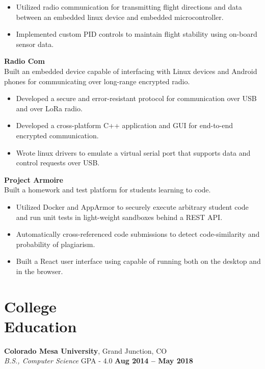 \documentclass[margin,line]{resume}
\begin{document}
\begin{resume}
	\begin{itemize}
	\item Utilized radio communication for transmitting
	      flight directions and data between an embedded linux
	      device and embedded microcontroller.
	\item Implemented custom PID controls to maintain flight stability
	      using on-board sensor data.
	\end{itemize}

    \textbf{Radio Com}\\
    Built an embedded device capable of interfacing with Linux devices and
    Android phones for communicating over long-range encrypted radio.

        \begin{itemize}
        \item Developed a secure and error-resistant protocol for communication
              over USB and over LoRa radio.
        \item Developed a cross-platform C++ application and GUI for end-to-end
              encrypted communication.
        \item Wrote linux drivers to emulate a virtual serial port that supports
              data and control requests over USB.
	\end{itemize}


    \textbf{Project Armoire}\\
    Built a homework and test platform for students learning to code.

        \begin{itemize}
        \item Utilized Docker and AppArmor to securely execute arbitrary student code
              and run unit tests in light-weight sandboxes behind a REST API.
        \item Automatically cross-referenced code submissions to detect code-similarity
              and probability of plagiarism.
        \item Built a React user interface using capable of running both on
              the desktop and in the browser.
        \end{itemize}

    \section{\mysidestyle College\\Education}

    \textbf{Colorado Mesa University}, Grand Junction, CO \vspace{2mm}\\\vspace{1mm}%
    \textsl{B.S., Computer Science} GPA - 4.0 \hfill \textbf{Aug 2014 -- May 2018}


\end{resume}
\end{document}
